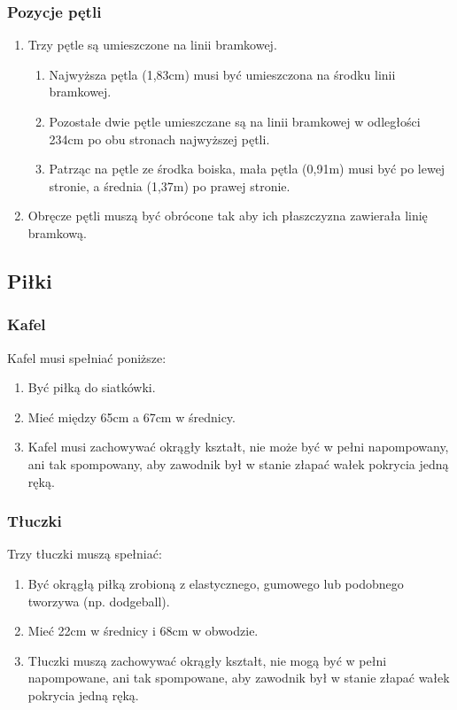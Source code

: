 \documentclass[11pt,a4paper]{article}
\begin{document}
\subsubsection{Pozycje pętli}
\begin{enumerate}
  \item Trzy pętle są umieszczone na linii bramkowej.
  \begin{enumerate}
    \item Najwyższa pętla (1,83cm) musi być umieszczona na środku linii bramkowej.
    \item Pozostałe dwie pętle umieszczane są na linii bramkowej w odległości 234cm po obu stronach najwyższej pętli.
    \item Patrząc na pętle ze środka boiska, mała pętla (0,91m) musi być po lewej stronie, a średnia (1,37m) po prawej stronie.
  \end{enumerate}
  \item Obręcze pętli muszą być obrócone tak aby ich płaszczyzna zawierała linię bramkową.
\end{enumerate}

\subsection{Piłki}

\subsubsection{Kafel}
Kafel musi spełniać poniższe:
\begin{enumerate}
  \item Być piłką do siatkówki.
  \item Mieć między 65cm a 67cm w średnicy.
  \item Kafel musi zachowywać okrągły kształt, nie może być w pełni napompowany, ani tak spompowany, aby zawodnik był w stanie złapać wałek pokrycia jedną ręką.
\end{enumerate}

\subsubsection{Tłuczki}
Trzy tłuczki muszą spełniać:
\begin{enumerate}
  \item Być okrągłą piłką zrobioną z elastycznego, gumowego lub podobnego tworzywa (np. dodgeball).
  \item Mieć 22cm w średnicy i 68cm w obwodzie.
  \item Tłuczki muszą zachowywać okrągły kształt, nie mogą być w pełni napompowane, ani tak spompowane, aby zawodnik był w stanie złapać wałek pokrycia jedną ręką.
\end{enumerate}
\end{document}
